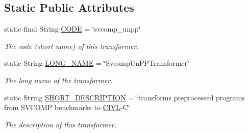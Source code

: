 \subsection*{Static Public Attributes}
\begin{DoxyCompactItemize}
\item 
\hypertarget{classedu_1_1udel_1_1cis_1_1vsl_1_1civl_1_1transform_1_1IF_1_1SvcompUnPPTransformer_af175c2861b483a5843b2ab31f6ab7398}{}static final String \hyperlink{classedu_1_1udel_1_1cis_1_1vsl_1_1civl_1_1transform_1_1IF_1_1SvcompUnPPTransformer_af175c2861b483a5843b2ab31f6ab7398}{C\+O\+D\+E} = \char`\"{}svcomp\+\_\+unpp\char`\"{}\label{classedu_1_1udel_1_1cis_1_1vsl_1_1civl_1_1transform_1_1IF_1_1SvcompUnPPTransformer_af175c2861b483a5843b2ab31f6ab7398}

\begin{DoxyCompactList}\small\item\em The code (short name) of this transformer. \end{DoxyCompactList}\item 
\hypertarget{classedu_1_1udel_1_1cis_1_1vsl_1_1civl_1_1transform_1_1IF_1_1SvcompUnPPTransformer_aeeb15c12ae8d2352a131a94b0bf744a3}{}static String \hyperlink{classedu_1_1udel_1_1cis_1_1vsl_1_1civl_1_1transform_1_1IF_1_1SvcompUnPPTransformer_aeeb15c12ae8d2352a131a94b0bf744a3}{L\+O\+N\+G\+\_\+\+N\+A\+M\+E} = \char`\"{}Svcomp\+Un\+P\+P\+Transformer\char`\"{}\label{classedu_1_1udel_1_1cis_1_1vsl_1_1civl_1_1transform_1_1IF_1_1SvcompUnPPTransformer_aeeb15c12ae8d2352a131a94b0bf744a3}

\begin{DoxyCompactList}\small\item\em The long name of the transformer. \end{DoxyCompactList}\item 
\hypertarget{classedu_1_1udel_1_1cis_1_1vsl_1_1civl_1_1transform_1_1IF_1_1SvcompUnPPTransformer_a4bd5924fe887327727c827558138bbce}{}static String \hyperlink{classedu_1_1udel_1_1cis_1_1vsl_1_1civl_1_1transform_1_1IF_1_1SvcompUnPPTransformer_a4bd5924fe887327727c827558138bbce}{S\+H\+O\+R\+T\+\_\+\+D\+E\+S\+C\+R\+I\+P\+T\+I\+O\+N} = \char`\"{}transforms preprocessed programs from S\+V\+C\+O\+M\+P benchmarks to \hyperlink{classedu_1_1udel_1_1cis_1_1vsl_1_1civl_1_1CIVL}{C\+I\+V\+L}-\/C\char`\"{}\label{classedu_1_1udel_1_1cis_1_1vsl_1_1civl_1_1transform_1_1IF_1_1SvcompUnPPTransformer_a4bd5924fe887327727c827558138bbce}

\begin{DoxyCompactList}\small\item\em The description of this transformer. \end{DoxyCompactList}\end{DoxyCompactItemize}


